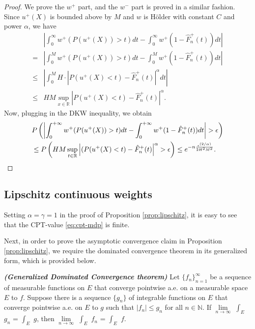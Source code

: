 \begin{proof}
We prove the $w^+$ part, and the $w^-$ part is proved in a similar fashion.
Since $u^+(X)$ is bounded above by $M$ and $w$ is H\"{o}lder with constant $C$ and power $\alpha$, we have
\begin{align*}
&\left|\int_0^{\infty} w^+(P(u^+(X))>t) dt- \int_0^{\infty} w^+(1- {\hat F^+_n}(t)) dt\right| \\ = &
    \left|\int_0^M w^+(P(u^+(X))>t) dt- \int_0^M w^+(1- {\hat F^+_n}(t)) dt\right| \\
\leq& \left|\int_0^M H\cdot |P(u^+(X)<t)-{\hat F^+_n}(t)|^\alpha dt\right|\\ \leq& HM\sup_{x\in
\mathbb{R}}\left|P(u^+(X)<t)-{\hat F^+_n}(t)\right|^\alpha.
\end{align*}
Now, plugging in the DKW inequality, we obtain
\begin{align}
&
P\left(\left|\intinfinity w^+(P(u^+(X))>t) dt- \intinfinity w^+(1- {\hat F^+_n}(t)) dt\right|>\epsilon\right)
\nonumber\\
& \leq P\left(HM\sup_{t\in \mathbb{R}} \left|(P(u^+(X)<t)-{\hat F^+_n}(t)\right|^\alpha>\epsilon\right)
\leq  e^{-n \frac{\epsilon ^{(2/\alpha)}} {2 H^2 M^2}}.\label{eq:dkw3}
\end{align}
\end{proof}

\subsection{Lipschitz continuous weights}
\label{sec:lipschitz-proofs}

 Setting $\alpha=\gamma=1$ in the proof of Proposition \ref{prop:lipschitz}, it is easy to see that the CPT-value \eqref{eq:cpt-mdp} is finite. 

Next, in order to prove the asymptotic convergence claim in Proposition \ref{prop:lipschitz}, we require the dominated convergence theorem in its generalized form, which is provided below.
\begin{theorem}{\textbf{\textit{(Generalized Dominated Convergence theorem)}}}
Let $\{f_n\}_{n=1}^\infty$ be a sequence of measurable functions on $E$ that converge pointwise a.e. on a measurable space $E$ to $f$.  Suppose there is a sequence $\{g_n\}$ of integrable functions on $E$ that converge pointwise a.e. on $E$ to $g$ such that $|f_n| \leq g_n$ for all $n \in \mathbb{N}$.  
If $\lim\limits_{n \rightarrow \infty}$ $\int_E$ $g_n$ = $\int_E$ $g$, then $\lim\limits_{n \rightarrow \infty}$ $\int_E$ $f_n$ = $\int_E$ $f$.
\end{theorem}


